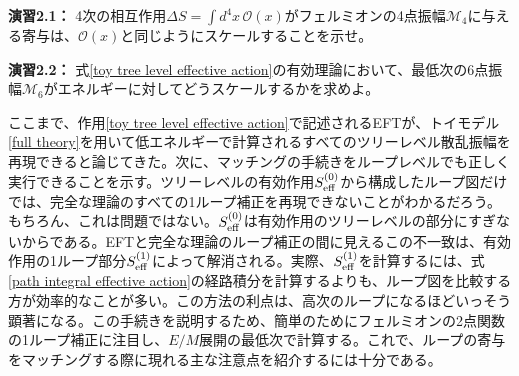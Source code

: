 \begin{eBox}
%
{\bf 演習2.1：} 4次の相互作用$\Delta S = \int d^4 x \, \mathcal{O} (x)$がフェルミオンの4点振幅$\mathcal M_4$に与える寄与は、$\mathcal{O} (x)$と同じようにスケールすることを示せ。
%
\end{eBox}
%
\begin{eBox}
%
{\bf 演習2.2：} 式\eqref{toy tree level effective action}の有効理論において、最低次の6点振幅$\mathcal M_6$がエネルギーに対してどうスケールするかを求めよ。
%
\end{eBox}



 \label{sec: matching at loop level}



ここまで、作用\eqref{toy tree level effective action}で記述されるEFTが、トイモデル\eqref{full theory}を用いて低エネルギーで計算されるすべてのツリーレベル散乱振幅を再現できると論じてきた。次に、マッチングの手続きをループレベルでも正しく実行できることを示す。ツリーレベルの有効作用$S^{(0)}_{\rm eff}$から構成したループ図だけでは、完全な理論のすべての1ループ補正を再現できないことがわかるだろう。もちろん、これは問題ではない。$S^{(0)}_{\rm eff}$は有効作用のツリーレベルの部分にすぎないからである。EFTと完全な理論のループ補正の間に見えるこの不一致は、有効作用の1ループ部分$S^{(1)}_{\rm eff}$によって解消される。実際、$S^{(1)}_{\rm eff}$を計算するには、式\eqref{path integral effective action}の経路積分を計算するよりも、ループ図を比較する方が効率的なことが多い。この方法の利点は、高次のループになるほどいっそう顕著になる。この手続きを説明するため、簡単のためにフェルミオンの2点関数の1ループ補正に注目し、$E/M$展開の最低次で計算する。これで、ループの寄与をマッチングする際に現れる主な注意点を紹介するには十分である。


